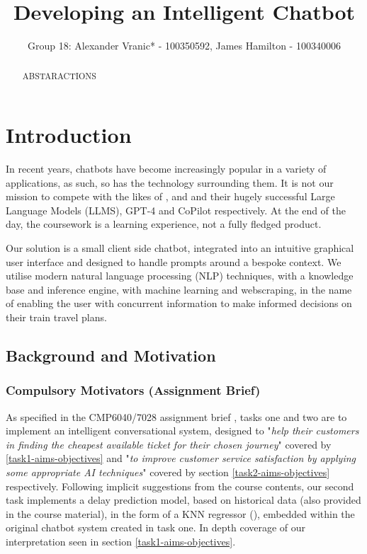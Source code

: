 \documentclass[11pt]{article}
\title{Developing an Intelligent Chatbot}
\author{Group 18: Alexander Vranic* - 100350592, James Hamilton - 100340006}
\begin{document}
\maketitle


\begin{abstract} \label{abstract}
    ABSTARACTIONS

\end{abstract}


\section{Introduction} \label{introduction}

In recent years, chatbots have become increasingly popular in a variety of applications, as such, so has the technology surrounding them. It is not our mission to compete with the likes of \cite{openai}, \cite{microsoft} and \cite{github} and their hugely successful Large Language Models (LLMS), GPT-4 \cite{gpt4} and CoPilot \cite{copilot} respectively. At the end of the day, the coursework is a learning experience, not a fully fledged product.

Our solution is a small client side chatbot, integrated into an intuitive graphical user interface and designed to handle prompts around a bespoke context. We utilise modern natural language processing (NLP) techniques, with a knowledge base and inference engine, with machine learning and webscraping, in the name of enabling the user with concurrent information to make informed decisions on their train travel plans.


\subsection{Background and Motivation} \label{background}

\subsubsection{Compulsory Motivators (Assignment Brief)} \label{compulsory-motivators}

As specified in the CMP6040/7028 assignment brief \cite{AI2018CW}, tasks one and two are to implement an intelligent conversational system, designed to "\textit{help their customers in finding the cheapest available ticket for their chosen journey}" covered by \ref{task1-aims-objectives} and "\textit{to improve customer service satisfaction by applying some appropriate AI techniques}" covered by section \ref{task2-aims-objectives} respectively. Following implicit suggestions from the course contents, our second task implements a delay prediction model, based on historical data (also provided in the course material), in the form of a KNN regressor (\cite{knn-origin}), embedded within the original chatbot system created in task one. In depth coverage of our interpretation seen in section \ref{task1-aims-objectives}.
\end{document}
